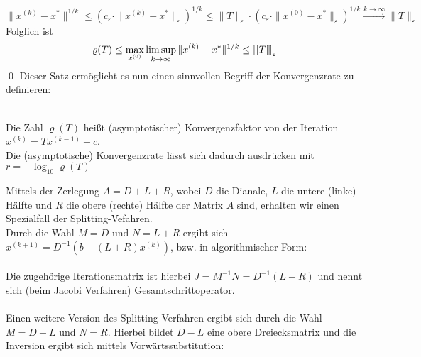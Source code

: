 \[\|x^{(k)}-x^*\|^{1/k}\leq\left(c_\varepsilon\cdot\|x^{(k)}-x^*\|_\varepsilon\right)^{1/k}
\leq \|T\|_\varepsilon\cdot\left(c_\varepsilon\cdot\|x^{(0)}-x^*\|_\varepsilon\right)^{1/k}
\xrightarrow{k\rightarrow\infty} \|T\|_\varepsilon\]
Folglich ist 
\[\varrho(T) \le \max_{x^{(0)}} \limsup_{k\rightarrow \infty} \|x^{(k)}-x^*\|^{1/k}\le {\left\vert\kern-0.25ex\left\vert\kern-0.25ex\left\vert T \right\vert\kern-0.25ex\right\vert\kern-0.25ex\right\vert}_\varepsilon\]
\qed
Dieser Satz ermöglicht es nun einen sinnvollen Begriff der Konvergenzrate zu definieren:
\begin{defbox} \\
    Die Zahl $\varrho(T)$ heißt (asymptotischer) Konvergenzfaktor von der Iteration $x^{(k)}=Tx^{(k-1)}+c$. \\
    Die (asymptotische) Konvergenzrate lässt sich dadurch ausdrücken mit $r=-\log_{10}\varrho(T)$
\end{defbox}
Mittels der Zerlegung $A=D+L+R$, wobei $D$ die Dianale, $L$ die untere (linke) Hälfte 
und $R$ die obere (rechte) Hälfte der Matrix $A$ sind, erhalten wir einen Spezialfall der Splitting-Vefahren. \\
Durch die Wahl $M=D$ und $N=L+R$ ergibt sich $x^{(k+1)}=D^{-1}(b - (L+R)x^{(k)})$, bzw. in algorithmischer Form:\\ \\
Die zugehörige Iterationsmatrix ist hierbei $J=M^{-1}N = D^{-1}(L+R)$ 
und nennt sich (beim Jacobi Verfahren) Gesamtschrittoperator. \\ \\
Einen weitere Version des Splitting-Verfahren ergibt sich durch die Wahl $M=D-L$ und $N=R$.
Hierbei bildet $D-L$ eine obere Dreiecksmatrix und die Inversion ergibt sich mittels Vorwärtssubstitution: \\ \\
